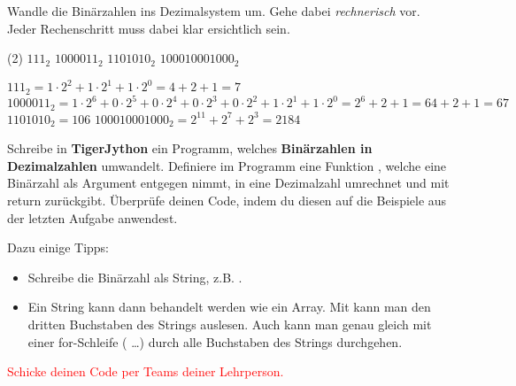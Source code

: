 \newpage

\begin{question}
	Wandle die Binärzahlen ins Dezimalsystem um. Gehe dabei \textit{rechnerisch} vor. Jeder Rechenschritt muss dabei klar ersichtlich sein.
	\begin{tasks}(2)
		\task $111_2$
		\task $1000011_2$
		\task $1101010_2$
		\task $100010001000_2$
	\end{tasks}
\end{question}
\begin{solution}
	\begin{tasks}
		\task $111_2 = 1\cdot2^2+1\cdot2^1+1\cdot2^0 = 4+2+1 = 7$
		\task $1000011_2 = 1\cdot2^6+0\cdot2^5+0\cdot2^4+0\cdot2^3+0\cdot2^2+1\cdot2^1+1\cdot2^0
		= 2^6+2+1=64+2+1=67$
		\task $1101010_2=106$
		\task $100010001000_2 = 2^{11}+2^7+2^3 = 2184$
	\end{tasks}
\end{solution}

\begin{question}
	Schreibe in \textbf{TigerJython} ein Programm, welches \textbf{Binärzahlen in Dezimalzahlen} umwandelt. Definiere im Programm eine Funktion , welche eine Binärzahl  als Argument entgegen nimmt, in eine Dezimalzahl umrechnet und mit return zurückgibt. Überprüfe deinen Code, indem du diesen auf die Beispiele aus der letzten Aufgabe anwendest.

	Dazu einige Tipps:
	\begin{itemize}
		\vspace{-\topsep}
		\item Schreibe die Binärzahl als String,  z.B. .
		\item Ein String kann dann behandelt werden wie ein Array. Mit  kann man den dritten Buchstaben des Strings  auslesen. Auch kann man genau gleich mit einer for-Schleife ( \ldots) durch alle Buchstaben des Strings durchgehen. 
	\end{itemize}		
\end{question}
\begin{solution}
	\textcolor{red}{Schicke deinen Code per Teams deiner Lehrperson.}
\end{solution}

\newpage

